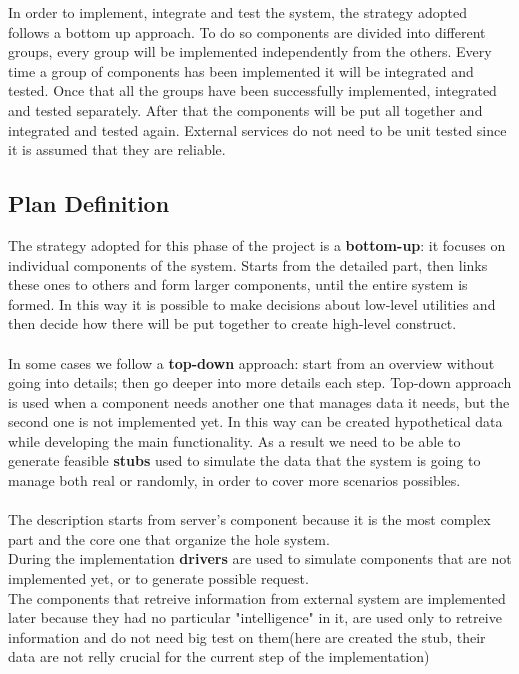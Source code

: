 In order to implement, integrate and test the system, the strategy adopted follows a bottom 
up approach. To do so components are divided into different groups, every group will be implemented independently from the others. 
Every time a group of components has been implemented it will be integrated and tested.
Once that all the groups have been successfully implemented, integrated and tested separately. After that the components will be 
put all together and integrated and tested again.
External services do not need to be unit tested since it is assumed that they are reliable. 

\subsection{Plan Definition}
The strategy adopted for this phase of the project is a \textbf{bottom-up}: it focuses on individual components of the system. 
Starts from the detailed part, then links these ones to others and form larger components, until the entire system is formed. In this way it is possible to make decisions about low-level utilities and then decide how there will be put together to create high-level construct.\\ \\
In some cases we follow a \textbf{top-down} approach: start from an overview without going into details; then go deeper into more details each step. Top-down approach is used when a component needs another one that manages data it needs, but the second one is not implemented yet. In this way can be created hypothetical data while developing the main functionality. As a result we need to be able to generate feasible \textbf{stubs} used to simulate the data that the system is going to manage both real or randomly, in order to cover more scenarios possibles.\\ \\
The description starts from server's component because it is the most complex part and the core one that organize the hole system.\\
During the implementation \textbf{drivers} are used to simulate components that are not implemented yet, or to generate possible request.\\
The components that retreive information from external system are implemented later because they had no particular "intelligence" in it, are used only to retreive information and do not need big test on them(here are created the stub, their data are not relly crucial for the current step of the implementation) 

